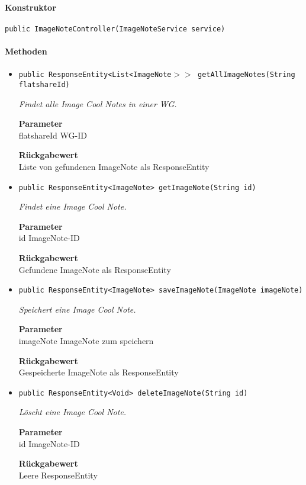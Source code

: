     \paragraph*{Konstruktor}
    \texttt{public ImageNoteController(ImageNoteService service)}
    \paragraph*{Methoden}
    \begin{itemize}
    	\item{\texttt{public ResponseEntity<List<ImageNote$>>$ getAllImageNotes(String flatshareId)}}
    	
    	\textit{Findet alle Image Cool Notes in einer WG.}
    	
    	\textbf{Parameter} \\
    	flatshareId WG-ID
    	
    	\textbf{Rückgabewert} \\
    	Liste von gefundenen ImageNote als ResponseEntity        \item{\texttt{public ResponseEntity<ImageNote> getImageNote(String id)}}
    	
    	\textit{Findet eine Image Cool Note.}
    	
    	\textbf{Parameter} \\
    	id ImageNote-ID
    	
    	\textbf{Rückgabewert} \\
    	Gefundene ImageNote als ResponseEntity        \item{\texttt{public ResponseEntity<ImageNote> saveImageNote(ImageNote imageNote)}}
    	
    	\textit{Speichert eine Image Cool Note.}
    	
    	\textbf{Parameter} \\
    	imageNote ImageNote zum speichern
    	
    	\textbf{Rückgabewert} \\
    	Gespeicherte ImageNote als ResponseEntity        \item{\texttt{public ResponseEntity<Void> deleteImageNote(String id)}}
    	
    	\textit{Löscht eine Image Cool Note.}
    	
    	\textbf{Parameter} \\
    	id ImageNote-ID
    	
    	\textbf{Rückgabewert} \\
    	Leere ResponseEntity
    \end{itemize}
